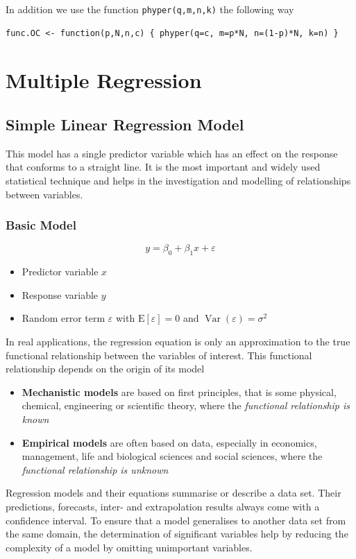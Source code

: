 \documentclass[11pt]{article}
\theoremstyle{definition}
\newcommand*\ev[1]{\mathrel{\text{E}\left[#1\right]}}
\newcommand*\Var[1]{\mathop{\text{Var}}\left(#1\right)}
\begin{document}
In addition we use the function \texttt{phyper(q,m,n,k)} the following way
\begin{verbatim}
func.OC <- function(p,N,n,c) { phyper(q=c, m=p*N, n=(1-p)*N, k=n) }
\end{verbatim}

\section{Multiple Regression}

\subsection{Simple Linear Regression Model}
This model has a single predictor variable which has an effect on the response that conforms to a straight line. It is the most important and widely used statistical technique and helps in the investigation and modelling of relationships between variables.

\subsubsection{Basic Model}
\begin{equation*}
	y = \beta_0 + \beta_1 x + \varepsilon
\end{equation*}
\begin{itemize}
	\item Predictor variable $x$
	\item Response variable $y$
	\item Random error term $\varepsilon$ with $\ev{\varepsilon} = 0$ and $\Var{\varepsilon} = \sigma^2$
\end{itemize}

In real applications, the regression equation is only an approximation to the true functional relationship between the variables of interest. This functional relationship depends on the origin of its model
\begin{itemize}[nosep]
	\item \textbf{Mechanistic models} are based on first principles, that is some physical, chemical, engineering or scientific theory, where the \textit{functional relationship is known}
	\item \textbf{Empirical models} are often based on data, especially in economics, management, life and biological sciences and social sciences, where the \textit{functional relationship is unknown}
\end{itemize}
Regression models and their equations summarise or describe a data set. Their predictions, forecasts, inter- and extrapolation results always come with a confidence interval. To ensure that a model generalises to another data set from the same domain, the determination of significant variables help by reducing the complexity of a model by omitting unimportant variables.
\end{document}
